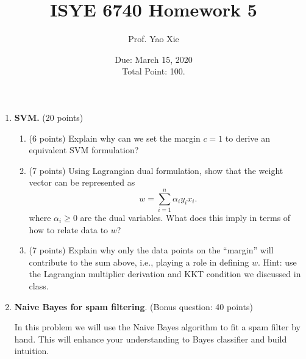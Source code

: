 \documentclass[twoside,12pt]{article}
\begin{document}
\title{ISYE 6740 Homework 5}
\author{Prof. Yao Xie}
\date{Due: March 15, 2020 \\Total Point: 100.}
\maketitle



\begin{enumerate}

\item{\bf SVM. } (20 points)

\begin{enumerate}
\item (6 points) Explain why can we set the margin $c = 1$ to derive an equivalent SVM formulation?
\item (7 points) Using Lagrangian dual formulation, show that the weight vector can be represented as
\[
w = \sum_{i=1}^n \alpha_i y_i x_i.
\]
where $\alpha_i \geq 0$ are the dual variables. What does this imply in terms of how to relate data to $w$?
\item (7 points) Explain why only the data points on the ``margin'' will contribute to the sum above, i.e., playing a role in defining $w$. Hint: use the Lagrangian multiplier derivation and KKT condition we discussed in class. 

\end{enumerate}


\clearpage

\item {\bf Naive Bayes for spam filtering}. (Bonus question: 40 points) 

In this problem we will use the Naive Bayes algorithm to fit a spam filter by hand. This will enhance your understanding to Bayes classifier and build intuition. 


\end{enumerate}
\end{document}
